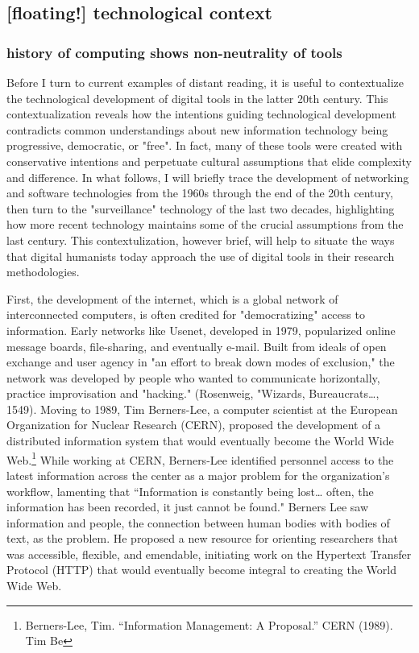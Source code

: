 \documentclass[11pt]{article}
\begin{document}
\subsection{[floating!] technological context}
\label{sec:orgc20b9ac}
\subsubsection{history of computing shows non-neutrality of tools}
\label{sec:orgdb19b0d}

Before I turn to current examples of distant reading, it is useful to
contextualize the technological development of digital tools in the
latter 20th century. This contextualization reveals how the intentions
guiding technological development contradicts common understandings
about new information technology being progressive, democratic, or
"free". In fact, many of these tools were created with conservative
intentions and perpetuate cultural assumptions that elide complexity
and difference. In what follows, I will briefly trace the development
of networking and software technologies from the 1960s through the end
of the 20th century, then turn to the "surveillance" technology of the
last two decades, highlighting how more recent technology maintains
some of the crucial assumptions from the last century. This
contextulization, however brief, will help to situate the ways that
digital humanists today approach the use of digital tools in their
research methodologies.

First, the development of the internet, which is a global network of
interconnected computers, is often credited for "democratizing" access
to information. Early networks like Usenet, developed in 1979,
popularized online message boards, file-sharing, and eventually
e-mail. Built from ideals of open exchange and user agency in "an
effort to break down modes of exclusion," the network was developed by
people who wanted to communicate horizontally, practice improvisation
and "hacking." (Rosenweig, "Wizards, Bureaucrats\ldots{}, 1549). Moving to
1989, Tim Berners-Lee, a computer scientist at the European
Organization for Nuclear Research (CERN), proposed the development of
a distributed information system that would eventually become the
World Wide Web.\footnote{Berners-Lee, Tim. “Information Management: A Proposal.” CERN (1989).
Tim Be} While working at CERN, Berners-Lee identified
personnel access to the latest information across the center as a
major problem for the organization’s workflow, lamenting that
“Information is constantly being lost… often, the information has been
recorded, it just cannot be found." Berners Lee saw information and
people, the connection between human bodies with bodies of text, as
the problem. He proposed a new resource for orienting researchers that
was accessible, flexible, and emendable, initiating work on the
Hypertext Transfer Protocol (HTTP) that would eventually become
integral to creating the World Wide Web.
\end{document}
